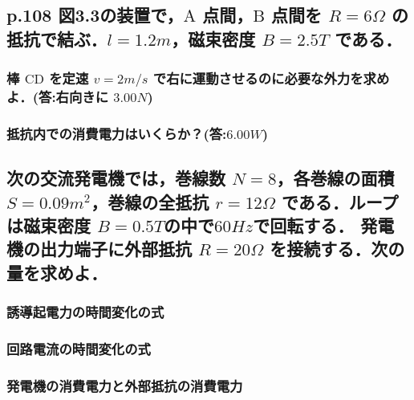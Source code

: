 \documentclass[a4paper, 12pt]{bxjsarticle}
\begin{document}
\begin{samepage}
\subsection{p.108 図3.3の装置で，\(\mathrm{A}\) 点間，\(\mathrm{B}\) 点間を \(R=6\si{\Omega}\) の抵抗で結ぶ．\(l=1.2\si{m}\)，磁束密度 \(B=2.5\si{T}\) である．}
\subsubsection{棒 \(\mathrm{CD}\) を定速 \(v=2\si{m/s}\) で右に運動させるのに必要な外力を求めよ．(答:右向きに \(3.00\si{N}\))}
\vspace*{7em}
\subsubsection{抵抗内での消費電力はいくらか？(答:\(6.00\si{W}\))}
\vspace*{7em}
\subsection{次の交流発電機では，巻線数 \(N=8\)，各巻線の面積 \(S=0.09\si{m^2}\)，巻線の全抵抗 \(r=12\si{\Omega}\) である．ループは磁束密度 \(B=0.5\si{T}\)の中で\(60\si{Hz}\)で回転する．%
発電機の出力端子に外部抵抗 \(R=20\si{\Omega}\) を接続する．次の量を求めよ．}
\subsubsection{誘導起電力の時間変化の式}
    \vspace*{7em}
\subsubsection{回路電流の時間変化の式}
    \vspace*{7em}
\subsubsection{発電機の消費電力と外部抵抗の消費電力}
    \vspace*{7em}
\end{samepage}
\newpage
\end{document}
